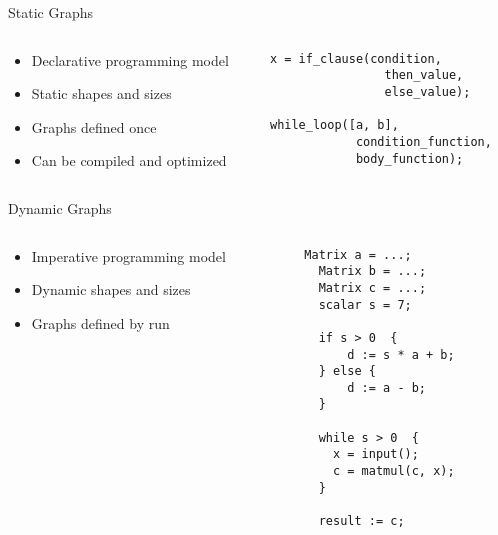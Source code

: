 \begin{frame}[fragile]{Static Graphs}
  \begin{columns}
    \begin{column}{0.55\textwidth}
      \begin{itemize}
        \item Declarative programming model
        \item Static shapes and sizes
        \item Graphs defined once
        \item Can be compiled and optimized
      \end{itemize}
    \end{column}
    \begin{column}{0.45\textwidth}
      \begin{lstlisting}[language=pseudoML]
x = if_clause(condition,
                then_value,
                else_value);

while_loop([a, b],
            condition_function,
            body_function);
      \end{lstlisting}
    \end{column}
  \end{columns}
\end{frame}


\begin{frame}[fragile]{Dynamic Graphs}
  \begin{columns}
    \begin{column}{0.55\textwidth}
      \begin{itemize}
        \item Imperative programming model
        \item Dynamic shapes and sizes
        \item Graphs defined by run
      \end{itemize}
    \end{column}
    \begin{column}{0.45\textwidth}
      \begin{lstlisting}[language=pseudoML]
  Matrix a = ...;
  Matrix b = ...;
  Matrix c = ...;
  scalar s = 7;

  if s > 0  {
      d := s * a + b;
  } else {
      d := a - b;
  }

  while s > 0  {
    x = input();
    c = matmul(c, x);
  }

  result := c;
      \end{lstlisting}
    \end{column}
  \end{columns}
\end{frame}
